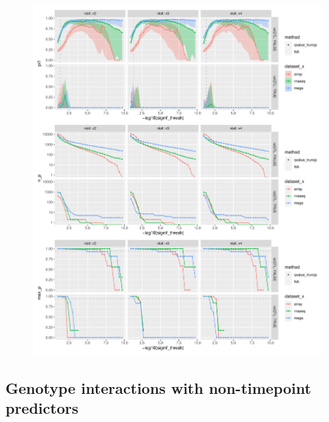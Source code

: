 \begin{figure}
    \centering
    \includegraphics[width=1.0\textwidth,page=1]{mainmatter/figures/chapter_03/compute_pi1.pi1_by_thresholds.pdf}
    \caption{}
    \label{fig:hird_eQTL_pi1vsGTExWholeBlood}
\end{figure}


\subsection{Genotype interactions with non-timepoint predictors}

